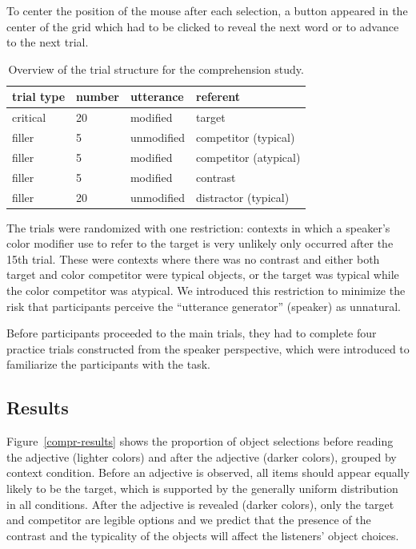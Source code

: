 \documentclass[10pt,letterpaper]{article}
\begin{document}
To center the position of the mouse after each selection, a button appeared in the center of the grid which had to be clicked to reveal the next word or to advance to the next trial. 

\begin{table}
	\begin{center} 
	\caption{Overview of the trial structure for the comprehension study.} 
	\label{tab:trialstructure}
	\vskip 0.12in
	\begin{tabular}{llll} 
	\hline
	\textbf{trial type} & \textbf{number} & \textbf{utterance} & \textbf{referent} \\
	\hline
	critical  & 20     & modified       & target                \\
	filler    & 5      & unmodified     & competitor (typical)  \\
	filler    & 5      & modified       & competitor (atypical) \\
	filler    & 5      & modified       & contrast              \\
	filler    & 20     & unmodified     & distractor (typical)  \\
	\hline
	\end{tabular} 
	\end{center} 
	\end{table}

The trials were randomized with one restriction: contexts in which a speaker's color modifier use to refer to the target is very unlikely only occurred after the 15th trial. These were contexts where there was no contrast and either both target and color competitor were typical objects, or the target was typical while the color competitor was atypical. We introduced this restriction to minimize the risk that participants perceive the ``utterance generator'' (speaker) as unnatural.

Before participants proceeded to the main trials, they had to complete four practice trials constructed from the speaker perspective, which were introduced to familiarize the participants with the task.


\subsection{Results}
Figure~\ref{compr-results} shows the proportion of object selections before reading the adjective (lighter colors) and after the adjective (darker colors), grouped by context condition. Before an adjective is observed, all items should appear equally likely to be the target, which is supported by the generally uniform distribution in all conditions. After the adjective is revealed (darker colors), only the target and competitor are legible options and we predict that the presence of the contrast and the typicality of the objects will affect the listeners' object choices.
\end{document}
